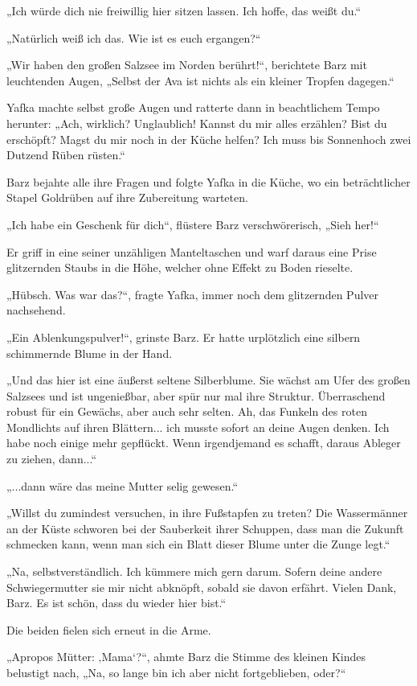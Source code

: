 „Ich würde dich nie freiwillig hier sitzen lassen. Ich hoffe, das weißt du.“

„Natürlich weiß ich das. Wie ist es euch ergangen?“

„Wir haben den großen Salzsee im Norden berührt!“, berichtete Barz mit leuchtenden Augen, „Selbst der Ava ist nichts als ein kleiner Tropfen dagegen.“

Yafka machte selbst große Augen und ratterte dann in beachtlichem Tempo herunter: „Ach, wirklich? Unglaublich! Kannst du mir alles erzählen? Bist du erschöpft? Magst du mir noch in der Küche helfen? Ich muss bis Sonnenhoch zwei Dutzend Rüben rüsten.“

Barz bejahte alle ihre Fragen und folgte Yafka in die Küche, wo ein beträchtlicher Stapel Goldrüben auf ihre Zubereitung warteten.

„Ich habe ein Geschenk für dich“, flüstere Barz verschwörerisch, „Sieh her!“

Er griff in eine seiner unzähligen Manteltaschen und warf daraus eine Prise glitzernden Staubs in die Höhe, welcher ohne Effekt zu Boden rieselte.

„Hübsch. Was war das?“, fragte Yafka, immer noch dem glitzernden Pulver nachsehend.

„Ein Ablenkungspulver!“, grinste Barz. Er hatte urplötzlich eine silbern schimmernde Blume in der Hand.

„Und das hier ist eine äußerst seltene Silberblume. Sie wächst am Ufer des großen Salzsees und ist ungenießbar, aber spür nur mal ihre Struktur. Überraschend robust für ein Gewächs, aber auch sehr selten. Ah, das Funkeln des roten Mondlichts auf ihren Blättern... ich musste sofort an deine Augen denken. Ich habe noch einige mehr gepflückt. Wenn irgendjemand es schafft, daraus Ableger zu ziehen, dann...“

„...dann wäre das meine Mutter selig gewesen.“

„Willst du zumindest versuchen, in ihre Fußstapfen zu treten? Die Wassermänner an der Küste schworen bei der Sauberkeit ihrer Schuppen, dass man die Zukunft schmecken kann, wenn man sich ein Blatt dieser Blume unter die Zunge legt.“

„Na, selbstverständlich. Ich kümmere mich gern darum. Sofern deine andere Schwiegermutter sie mir nicht abknöpft, sobald sie davon erfährt. Vielen Dank, Barz. Es ist schön, dass du wieder hier bist.“

Die beiden fielen sich erneut in die Arme.

„Apropos Mütter: ‚Mama‘?“, ahmte Barz die Stimme des kleinen Kindes belustigt nach, „Na, so lange bin ich aber nicht fortgeblieben, oder?“

